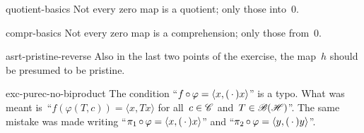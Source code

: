 \begin{erratum}{quotient-basics}%
Not every zero map is a quotient; only those into~$0$.
\end{erratum}
\begin{erratum}{compr-basics}%
Not every zero map is a comprehension; only those from~$0$.
\end{erratum}
\begin{erratum}{asrt-pristine-reverse}%
Also in the last two points of the exercise,
    the map~$h$ should be presumed to be pristine.
\end{erratum}
\begin{erratum}{exc-purec-no-biproduct}%
The condition
    ``$f \mathop{\circ} \varphi = \langle x, (\,\cdot\,) x\rangle$''
        is a typo.
        What was meant is~``$f (\varphi(T, c)) = \langle x, T x\rangle $
        for all~$c \in \mathscr{C}$
        and~$T \in \mathscr{B}(\mathscr{H})$''.
The same mistake was made writing
    ``$\pi_1 \mathop{\circ} \varphi = \langle x, (\,\cdot\,) x\rangle$'' and
    ``$\pi_2 \mathop{\circ} \varphi = \langle y, (\,\cdot\,) y\rangle$''.
\end{erratum}

